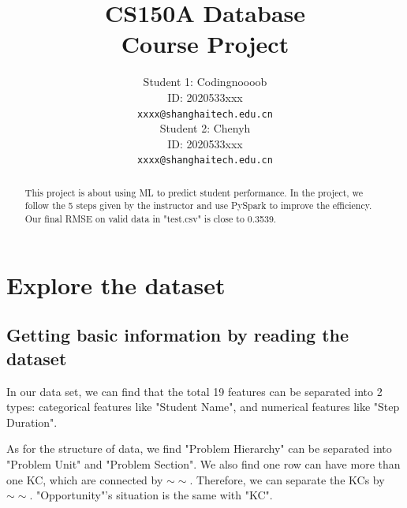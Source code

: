\documentclass{article}
\title{CS150A Database \\Course Project}
\author{
  Student 1: Codingnoooob\\
  ID: 2020533xxx\\
  \texttt{xxxx@shanghaitech.edu.cn} \\
   \And
  Student 2: Chenyh\\
  ID: 2020533xxx\\
  \texttt{xxxx@shanghaitech.edu.cn}
}
\begin{document}

\maketitle

\begin{abstract}
This project is about using ML to predict student performance. In the project, we follow the 5 steps given by the instructor and use PySpark to improve the efficiency.
Our final RMSE on valid data in "test.csv" is close to 0.3539.
\end{abstract}

\section{Explore the dataset}
\subsection{Getting basic information by reading the dataset}
In our data set, we can find that the total 19 features can be separated into 2 types: categorical features like "Student Name", and numerical features like 
"Step Duration".

As for the structure of data, we find "Problem Hierarchy" can be separated into "Problem Unit" and "Problem
Section". We also find one row can have more than one KC, which are connected by $\sim\sim$. Therefore, we can separate the KCs by $\sim\sim$. "Opportunity"'s situation is the same with "KC".
\end{document}

